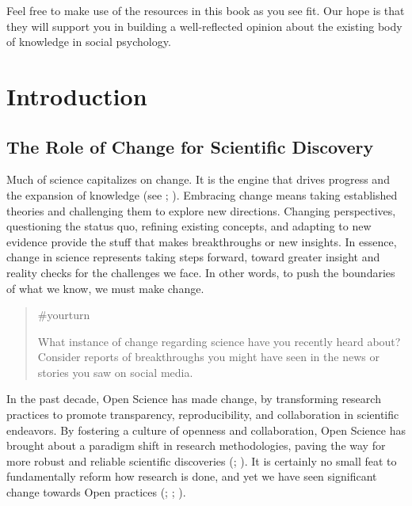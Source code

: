 \documentclass[
  letterpaper,
]{book}
\begin{document}
Feel free to make use of the resources in this book as you see fit. Our
hope is that they will support you in building a well-reflected opinion
about the existing body of knowledge in social psychology.


\chapter*{\texorpdfstring{{Introduction}}{Introduction}}\label{introduction}


\section*{The Role of Change for Scientific
Discovery}\label{the-role-of-change-for-scientific-discovery}


Much of science capitalizes on change. It is the engine that drives
progress and the expansion of knowledge (see
;
). Embracing change means
taking established theories and challenging them to explore new
directions. Changing perspectives, questioning the status quo, refining
existing concepts, and adapting to new evidence provide the stuff that
makes breakthroughs or new insights. In essence, change in science
represents taking steps forward, toward greater insight and reality
checks for the challenges we face. In other words, to push the
boundaries of what we know, we must make change.

\begin{quote}
{\#yourturn}

What instance of change regarding science have you recently heard about?
Consider reports of breakthroughs you might have seen in the news or
stories you saw on social media.
\end{quote}

In the past decade, Open Science has made change, by transforming
research practices to promote transparency, reproducibility, and
collaboration in scientific endeavors. By fostering a culture of
openness and collaboration, Open Science has brought about a paradigm
shift in research methodologies, paving the way for more robust and
reliable scientific discoveries
(;
). It is certainly no small feat to fundamentally reform how
research is done, and yet we have seen significant change towards Open
practices (;
;
).
\end{document}
